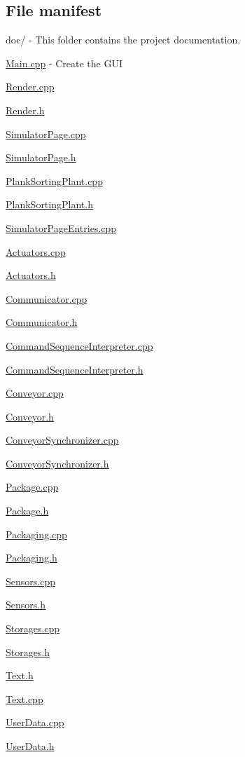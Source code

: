 \subsection*{File manifest}


\begin{DoxyItemize}
\item doc/ -\/ This folder contains the project documentation.
\item \hyperlink{Main_8cpp}{Main.\-cpp} -\/ Create the G\-U\-I
\item \hyperlink{Render_8cpp}{Render.\-cpp}
\item \hyperlink{Render_8h}{Render.\-h}
\item \hyperlink{SimulatorPage_8cpp}{Simulator\-Page.\-cpp}
\item \hyperlink{SimulatorPage_8h}{Simulator\-Page.\-h}
\item \hyperlink{PlankSortingPlant_8cpp}{Plank\-Sorting\-Plant.\-cpp}
\item \hyperlink{PlankSortingPlant_8h}{Plank\-Sorting\-Plant.\-h}
\item \hyperlink{SimulatorPageEntries_8cpp}{Simulator\-Page\-Entries.\-cpp}
\item \hyperlink{Actuators_8cpp}{Actuators.\-cpp}
\item \hyperlink{Actuators_8h}{Actuators.\-h}
\item \hyperlink{Communicator_8cpp}{Communicator.\-cpp}
\item \hyperlink{Communicator_8h}{Communicator.\-h}
\item \hyperlink{CommandSequenceInterpreter_8cpp}{Command\-Sequence\-Interpreter.\-cpp}
\item \hyperlink{CommandSequenceInterpreter_8h}{Command\-Sequence\-Interpreter.\-h}
\item \hyperlink{Conveyor_8cpp}{Conveyor.\-cpp}
\item \hyperlink{Conveyor_8h}{Conveyor.\-h}
\item \hyperlink{ConveyorSynchronizer_8cpp}{Conveyor\-Synchronizer.\-cpp}
\item \hyperlink{ConveyorSynchronizer_8h}{Conveyor\-Synchronizer.\-h}
\item \hyperlink{Package_8cpp}{Package.\-cpp}
\item \hyperlink{Package_8h}{Package.\-h}
\item \hyperlink{Packaging_8cpp}{Packaging.\-cpp}
\item \hyperlink{Packaging_8h}{Packaging.\-h}
\item \hyperlink{Sensors_8cpp}{Sensors.\-cpp}
\item \hyperlink{Sensors_8h}{Sensors.\-h}
\item \hyperlink{Storages_8cpp}{Storages.\-cpp}
\item \hyperlink{Storages_8h}{Storages.\-h}
\item \hyperlink{Text_8h}{Text.\-h}
\item \hyperlink{Text_8cpp}{Text.\-cpp}
\item \hyperlink{UserData_8cpp}{User\-Data.\-cpp}
\item \hyperlink{UserData_8h}{User\-Data.\-h}
\end{DoxyItemize}

